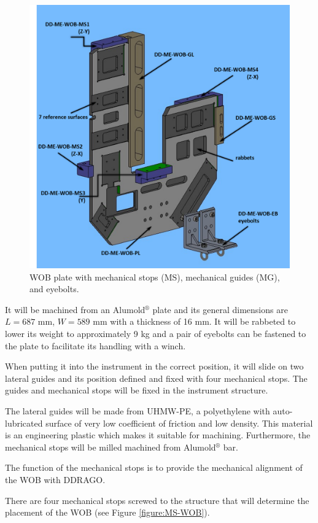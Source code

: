 \documentclass{report}
\begin{document}
\begin{figure}
\begin{center}
\includegraphics[width=0.7\linewidth]{figures/WOB_plate.png}
\end{center}
\caption{WOB plate with mechanical stops (MS), mechanical guides (MG), and eyebolts.}
\label{figure:WOB_plate}
\end{figure}

It will be machined from an Alumold${}^\circledR$ plate and its general dimensions are $L=687$ mm, $W=589$ mm with a thickness of 16 mm. It will be rabbeted to lower its weight to approximately 9 kg and a pair of eyebolts can be fastened to the plate to facilitate its handling with a winch.

When putting it into the instrument in the correct position, it will slide on two lateral guides and its position defined and fixed with four mechanical stops. The guides and mechanical stops will be fixed in the instrument structure.

The lateral guides will be made from UHMW-PE, a polyethylene with auto-lubricated surface of very low coefficient of friction and low density. This material is an engineering plastic which makes it suitable for machining. Furthermore, the mechanical stops will be milled machined from Alumold${}^\circledR$ bar.

The function of the mechanical stops is to provide the mechanical alignment of the WOB with DDRAGO.

There are four mechanical stops screwed to the structure that will determine the placement of the WOB (see Figure \ref{figure:MS-WOB}).
\end{document}

